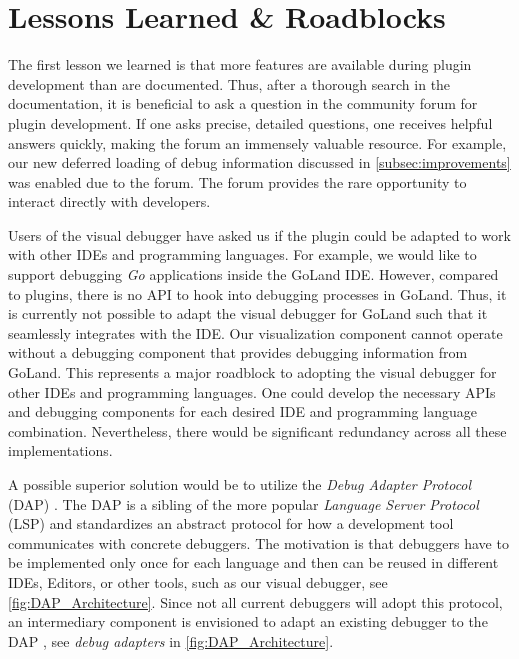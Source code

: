 \documentclass[sigconf]{acmart}
\begin{document}
\section{Lessons Learned \& Roadblocks} \label{sec:lessonsLearned}
The first lesson we learned is that more features are available during plugin development than are documented.
Thus, after a thorough search in the documentation, it is beneficial to ask a question in the community forum for plugin development.
If one asks precise, detailed questions, one receives helpful answers quickly, making the forum an immensely valuable resource.
For example, our new deferred loading of debug information discussed in \autoref{subsec:improvements} was enabled due to the \intellij{} forum.
The forum provides the rare opportunity to interact directly with \intellij{} developers.


Users of the visual debugger have asked us if the plugin could be adapted to work with other IDEs and programming languages.
For example, we would like to support debugging \textit{Go} applications inside the GoLand IDE.
However, compared to \intellij{} plugins, there is no API to hook into debugging processes in GoLand.
Thus, it is currently not possible to adapt the visual debugger for GoLand such that it seamlessly integrates with the IDE.
Our visualization component cannot operate without a debugging component that provides debugging information from GoLand.
This represents a major roadblock to adopting the visual debugger for other IDEs and programming languages.
One could develop the necessary APIs and debugging components for each desired IDE and programming language combination.
Nevertheless, there would be significant redundancy across all these implementations.

A possible superior solution would be to utilize the \textit{Debug Adapter Protocol} (DAP) \cite{microsoftDebugAdapterProtocol2023}.
The DAP is a sibling of the more popular \textit{Language Server Protocol} (LSP) \cite{microsoftLanguageServerProtocol2023} and standardizes an abstract protocol for how a development tool communicates with concrete debuggers.
The motivation is that debuggers have to be implemented only once for each language and then can be reused in different IDEs, Editors, or other tools, such as our visual debugger, see \autoref{fig:DAP_Architecture}.
Since not all current debuggers will adopt this protocol, an intermediary component is envisioned to adapt an existing debugger to the DAP \cite{microsoftDebugAdapterProtocol2023}, see \textit{debug adapters} in \autoref{fig:DAP_Architecture}.
\end{document}
